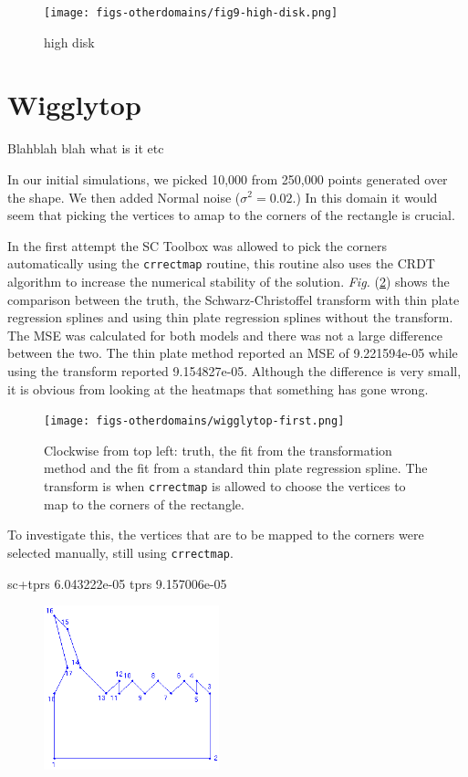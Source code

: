 \documentclass[a4paper,10pt]{amsart}
\newcommand{\sch}{Schwarz-Christoffel }
\newcommand{\Fig}[1]{\emph{Fig.} (\ref{#1})}
\begin{document}
\begin{figure}
\centering
\texttt{[image: figs-otherdomains/fig9-high-disk.png]} \\
\caption{high disk}
\label{fig9-high-disk}
\end{figure}


\section{Wigglytop}


Blahblah blah what is it etc

In our initial simulations, we picked 10,000 from 250,000 points generated over the shape. We then added Normal noise ($\sigma^2=0.02$.) In this domain it would seem that picking the vertices to amap to the corners of the rectangle is crucial.

In the first attempt the SC Toolbox was allowed to pick the corners automatically using the \texttt{crrectmap} routine, this routine also uses the CRDT algorithm to increase the numerical stability of the solution. \Fig{wigglyfirstcomp} shows the comparison between the truth, the \sch transform with thin plate regression splines and using thin plate regression splines without the transform. The MSE was calculated for both models and there was not a large difference between the two. The thin plate method reported an MSE of 9.221594e-05 while using the transform reported 9.154827e-05. Although the difference is very small, it is obvious from looking at the heatmaps that something has gone wrong.

\begin{figure}
\centering
\texttt{[image: figs-otherdomains/wigglytop-first.png]} \\
\caption{Clockwise from top left: truth, the fit from the transformation method and the fit from a standard thin plate regression spline. The transform is when \texttt{crrectmap} is allowed to choose the vertices to map to the corners of the rectangle.}
\label{wigglyfirstcomp}
\end{figure}

To investigate this, the vertices that are to be mapped to the corners were selected manually, still using \texttt{crrectmap}. 

sc+tprs 6.043222e-05 
tprs 9.157006e-05 

\begin{figure}
\centering
\includegraphics[width=2in]{figs-otherdomains/wigglytop-numbered.png} \\
\caption{}
\label{wigglynumbered}
\end{figure}
\end{document}
